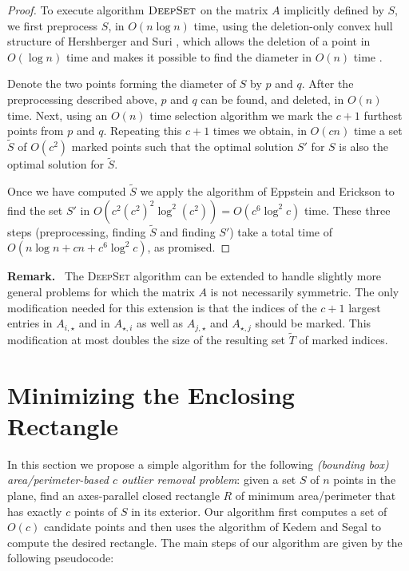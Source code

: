 \documentclass{elsart}
\renewcommand{\paragraph}[1]{\noindent\textbf{#1}\ }
\begin{document}
\begin{proof}
To execute algorithm $\textsc{DeepSet}$ on the matrix $A$ implicitly
defined by $S$, we first preprocess $S$, in $O(n\log n)$ time, using
the deletion-only convex hull structure of Hershberger and Suri
\cite{hs92}, which allows the deletion of a point in $O(\log n)$ time
and makes it possible to find the diameter in $O(n)$ time \cite{s78}.

Denote the two points forming the diameter of $S$ by $p$ and $q$.
After the preprocessing described above, $p$ and $q$ can be found, and
deleted, in $O(n)$ time.  Next, using an $O(n)$ time selection
algorithm we mark the $c+1$ furthest points from $p$ and $q$.
Repeating this $c+1$ times we obtain, in $O(cn)$ time a set
$\tilde{S}$ of $O(c^2)$ marked points such that the optimal solution
$S'$ for $S$ is also the optimal solution for $\tilde{S}$.

Once we have computed $\tilde{S}$ we apply the algorithm of Eppstein
and Erickson \cite{ee94} to find the set $S'$ in $O(c^2 (c^2)^2\log^2
(c^2)) = O(c^6\log^2 c)$ time.  These three steps (preprocessing,
finding $\tilde{S}$ and finding $S'$) take a total time of $O(n\log n
+ cn + c^6 \log^2 c)$, as promised.
\end{proof}

\paragraph{Remark.} The \textsc{DeepSet} algorithm can be extended to
handle slightly more general problems for which the matrix $A$ is not
necessarily symmetric.  The only modification needed for this
extension is that the indices of the $c+1$ largest entries in
$A_{i,\star}$ and in $A_{\star,i}$ as well as $A_{j,\star}$ and
$A_{\star,j}$ should be marked.  This modification at most doubles the
size of the resulting set $\tilde{T}$ of marked indices.

\section{Minimizing the Enclosing Rectangle}

In this section we propose a simple algorithm for the following
\emph{(bounding box) area/perimeter-based $c$ outlier removal
problem}: given a set $S$ of $n$ points in the plane, find an
axes-parallel closed rectangle $R$ of minimum area/perimeter that has
exactly $c$ points of $S$ in its exterior.  Our algorithm first
computes a set of $O(c)$ candidate points and then uses the algorithm
of Kedem and Segal \cite{sk98} to compute the desired rectangle.  The
main steps of our algorithm are given by the following pseudocode:
\end{document}
